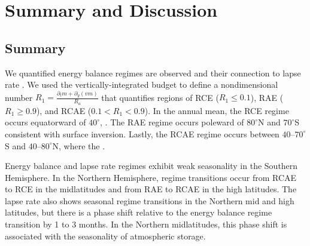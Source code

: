 \documentclass{ametsocV5}
\begin{document}
\section{Summary and Discussion}\label{sec:conclusion}
\subsection{Summary}
We quantified  energy balance regimes are observed and their connection to lapse rate . We used the vertically-integrated  budget to define a nondimensional number $R_1=\frac{\partial_t m + \partial_y (vm)}{R_a}$ that quantifies regions of RCE ($R_1\le0.1$), RAE ($R_1\ge0.9$), and RCAE ($0.1<R_1<0.9$). In the annual mean, the RCE regime occurs equatorward of $40^\circ$, . The RAE regime occurs poleward of $80^\circ$N and $70^\circ$S consistent with  surface inversion. Lastly, the RCAE regime occurs between $40$--$70^\circ$S and $40$--$80^\circ$N, where the .

Energy balance and lapse rate regimes exhibit weak seasonality in the Southern Hemisphere. In the Northern Hemisphere, regime transitions occur from RCAE to RCE in the midlatitudes and from RAE to RCAE in the high latitudes. The lapse rate also shows seasonal regime transitions in the Northern mid and high latitudes, but there is a phase shift relative to the energy balance regime transition by 1 to 3 months. In the Northern midlatitudes, this phase shift is associated with the seasonality of atmospheric storage.
\end{document}
